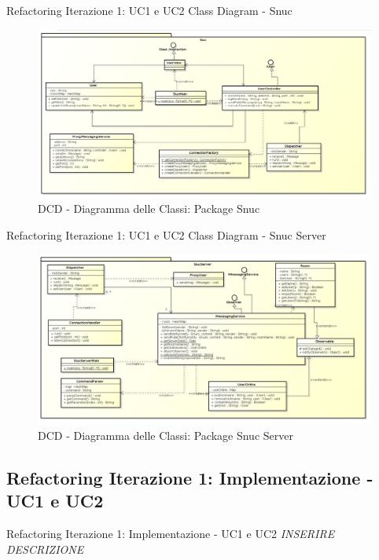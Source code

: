\documentclass[t]{beamer} %
\begin{document}
\begin{frame} {Refactoring Iterazione 1: UC1 e UC2 Class Diagram - Snuc}
   \begin{figure}
     \includegraphics[scale=0.235]{image_astah/Iteration_1_DesignModel_Refactored/ClassDiagramSnuc.png}{\centering}
     \caption{DCD - Diagramma delle Classi: Package Snuc }
     \label{fig_UC1_UC2_DCDR_3} 
   \end{figure}
\end{frame}

\begin{frame} {Refactoring Iterazione 1: UC1 e UC2 Class Diagram - Snuc Server}
   \begin{figure}
     \includegraphics[scale=0.245]{image_astah/Iteration_1_DesignModel_Refactored/ClassDiagramSnucServer.png}{\centering}
     \caption{DCD - Diagramma delle Classi: Package Snuc Server }
     \label{fig_UC1_UC2_DCDR_2} 
   \end{figure}
\end{frame}

\subsection{Refactoring Iterazione 1: Implementazione - UC1 e UC2}
\begin{frame} {Refactoring Iterazione 1: Implementazione - UC1 e UC2}
 \emph{INSERIRE DESCRIZIONE}
\end{frame}
\end{document}
